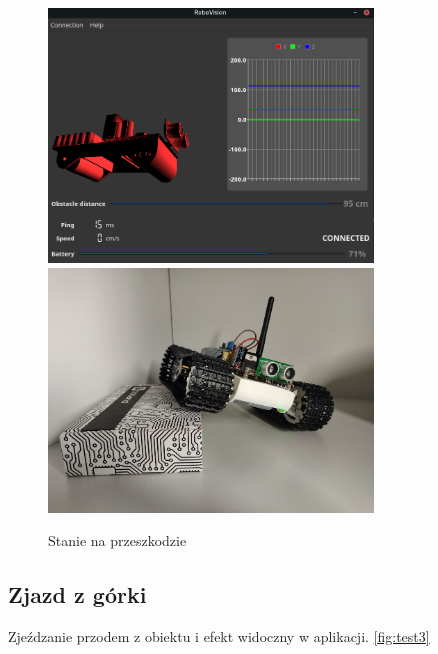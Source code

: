 \documentclass[12pt,a4paper,polish]{article}
\begin{document}
  \begin{figure}[h]
    \centering
    \includegraphics[width=0.77\textwidth]{img/final/2.png}
    \includegraphics[width=0.77\textwidth]{img/final/2e.jpg}
    \caption{Stanie na przeszkodzie}
    \label{fig:test2}
  \end{figure}

  \subsection{Zjazd z górki}
  Zjeźdzanie przodem z obiektu i efekt widoczny w aplikacji.
  \ref{fig:test3}
\end{document}
